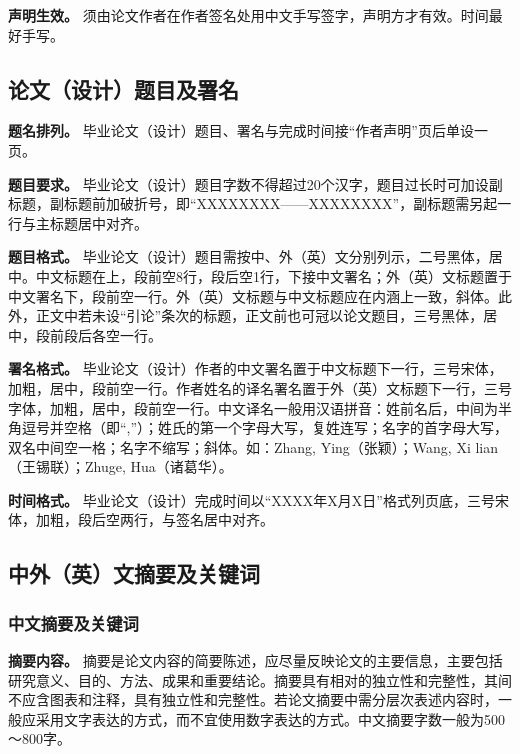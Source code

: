 \documentclass[singlesided]{Style/ucasthesis}%
\begin{document}
\textbf{声明生效。} 须由论文作者在作者签名处用中文手写签字，声明方才有效。时间最好手写。

\hypertarget{section-13}{%
\subsection{论文（设计）题目及署名}\label{section-13}}

\textbf{题名排列。} 毕业论文（设计）题目、署名与完成时间接``作者声明''页后单设一页。

\textbf{题目要求。} 毕业论文（设计）题目字数不得超过20个汉字，题目过长时可加设副标题，副标题前加破折号，即``XXXXXXXX------XXXXXXXX''，副标题需另起一行与主标题居中对齐。

\textbf{题目格式。} 毕业论文（设计）题目需按中、外（英）文分别列示，二号黑体，居中。中文标题在上，段前空8行，段后空1行，下接中文署名；外（英）文标题置于中文署名下，段前空一行。外（英）文标题与中文标题应在内涵上一致，斜体。此外，正文中若未设``引论''条次的标题，正文前也可冠以论文题目，三号黑体，居中，段前段后各空一行。

\textbf{署名格式。} 毕业论文（设计）作者的中文署名置于中文标题下一行，三号宋体，加粗，居中，段前空一行。作者姓名的译名署名置于外（英）文标题下一行，三号字体，加粗，居中，段前空一行。中文译名一般用汉语拼音：姓前名后，中间为半角逗号并空格（即``,''）；姓氏的第一个字母大写，复姓连写；名字的首字母大写，双名中间空一格；名字不缩写；斜体。如：Zhang, Ying（张颖）；Wang, Xi lian（王锡联）；Zhuge, Hua（诸葛华）。

\textbf{时间格式。} 毕业论文（设计）完成时间以``XXXX年X月X日''格式列页底，三号宋体，加粗，段后空两行，与签名居中对齐。

\hypertarget{section-14}{%
\subsection{中外（英）文摘要及关键词}\label{section-14}}

\hypertarget{section-15}{%
\subsubsection{中文摘要及关键词}\label{section-15}}

\textbf{摘要内容。} 摘要是论文内容的简要陈述，应尽量反映论文的主要信息，主要包括研究意义、目的、方法、成果和重要结论。摘要具有相对的独立性和完整性，其间不应含图表和注释，具有独立性和完整性。若论文摘要中需分层次表述内容时，一般应采用文字表达的方式，而不宜使用数字表达的方式。中文摘要字数一般为500～800字。
\end{document}

